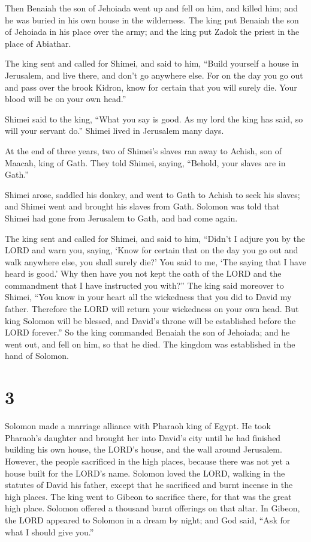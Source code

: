  Then Benaiah the son of Jehoiada went up and fell on him,
and killed him; and he was buried in his own house in the wilderness.
 The king put Benaiah the son of Jehoiada in his place over
the army; and the king put Zadok the priest in the place of Abiathar.

 The king sent and called for Shimei, and said to him,
``Build yourself a house in Jerusalem, and live there, and don't go
anywhere else.  For on the day you go out and pass over the
brook Kidron, know for certain that you will surely die. Your blood will
be on your own head.''

 Shimei said to the king, ``What you say is good. As my
lord the king has said, so will your servant do.'' Shimei lived in
Jerusalem many days.

 At the end of three years, two of Shimei's slaves ran away
to Achish, son of Maacah, king of Gath. They told Shimei, saying,
``Behold, your slaves are in Gath.''

 Shimei arose, saddled his donkey, and went to Gath to
Achish to seek his slaves; and Shimei went and brought his slaves from
Gath.  Solomon was told that Shimei had gone from Jerusalem
to Gath, and had come again.

 The king sent and called for Shimei, and said to him,
``Didn't I adjure you by the LORD and warn you, saying, `Know for
certain that on the day you go out and walk anywhere else, you shall
surely die?' You said to me, `The saying that I have heard is good.'
 Why then have you not kept the oath of the LORD and the
commandment that I have instructed you with?''  The king
said moreover to Shimei, ``You know in your heart all the wickedness
that you did to David my father. Therefore the LORD will return your
wickedness on your own head.  But king Solomon will be
blessed, and David's throne will be established before the LORD
forever.''  So the king commanded Benaiah the son of
Jehoiada; and he went out, and fell on him, so that he died. The kingdom
was established in the hand of Solomon.

\hypertarget{section-2}{%
\section{3}\label{section-2}}

 Solomon made a marriage alliance with Pharaoh king of
Egypt. He took Pharaoh's daughter and brought her into David's city
until he had finished building his own house, the LORD's house, and the
wall around Jerusalem.  However, the people sacrificed in
the high places, because there was not yet a house built for the LORD's
name.  Solomon loved the LORD, walking in the statutes of
David his father, except that he sacrificed and burnt incense in the
high places.  The king went to Gibeon to sacrifice there,
for that was the great high place. Solomon offered a thousand burnt
offerings on that altar.  In Gibeon, the LORD appeared to
Solomon in a dream by night; and God said, ``Ask for what I should give
you.''

